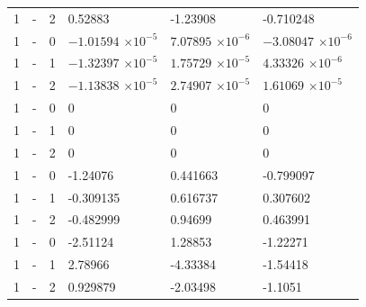 \begin{longtable}
{}1 & \allowbreak{}-\allowbreak{} & 2 & 0.52883 & -1.23908 & -0.710248 \\
{}1 & \allowbreak{}-\allowbreak{} & 0 &  &  &  \\
{}1 & \allowbreak{}-\allowbreak{} & 1 &  &  &  \\
{}1 & \allowbreak{}-\allowbreak{} & 2 &  &  &  \\
{}1 & \allowbreak{}-\allowbreak{} & 0 & 0 & 0 & 0 \\
{}1 & \allowbreak{}-\allowbreak{} & 1 & 0 & 0 & 0 \\
{}1 & \allowbreak{}-\allowbreak{} & 2 & 0 & 0 & 0 \\
{}1 & \allowbreak{}-\allowbreak{} & 0 & -1.24076 & 0.441663 & -0.799097 \\
{}1 & \allowbreak{}-\allowbreak{} & 1 & -0.309135 & 0.616737 & 0.307602 \\
{}1 & \allowbreak{}-\allowbreak{} & 2 & -0.482999 & 0.94699 & 0.463991 \\
{}1 & \allowbreak{}-\allowbreak{} & 0 & -2.51124 & 1.28853 & -1.22271 \\
{}1 & \allowbreak{}-\allowbreak{} & 1 & 2.78966 & -4.33384 & -1.54418 \\
{}1 & \allowbreak{}-\allowbreak{} & 2 & 0.929879 & -2.03498 & -1.1051 \\

\end{longtable}
